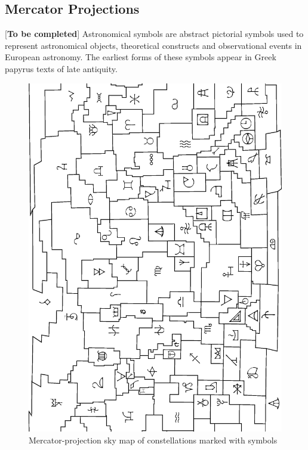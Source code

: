 \documentclass[a4paper,12pt]{extarticle}
\begin{document}
\subsection{Mercator Projections}
[\textbf{To be completed}] Astronomical symbols are abstract pictorial symbols used to represent astronomical objects, theoretical constructs and observational events in European astronomy. The earliest forms of these symbols appear in Greek papyrus texts of late antiquity.
\begin{figure}[H]
	\centering
	\includegraphics[width=0.8\linewidth]{starmap-glyph.png}
	\caption{Mercator-projection sky map of constellations marked with symbols}
\end{figure}
\end{document}
